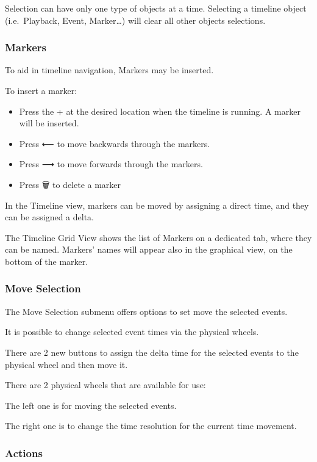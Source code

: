 \documentclass[
]{article}
\begin{document}
{Selection can have only one type of objects at a time. Selecting a timeline object (i.e.~Playback, Event, Marker\ldots) will clear all other objects selections.}

\hypertarget{markers}{%
\subsubsection{Markers}\label{markers}}

To aid in timeline navigation, Markers may be inserted.

To insert a marker:

\begin{itemize}
\item
  Press the + at the desired location when the timeline is running. A marker will be inserted.
\item
  Press ⟵ to move backwards through the markers.
\item
  Press ⟶ to move forwards through the markers.
\item
  Press 🗑️ to delete a marker
\end{itemize}

In the Timeline view, markers can be moved by assigning a direct time, and they can be assigned a delta.

The Timeline Grid View shows the list of Markers on a dedicated tab, where they can be named.
Markers' names will appear also in the graphical view, on the bottom of the marker.

\hypertarget{move-selection}{%
\subsubsection{Move Selection}\label{move-selection}}

The Move Selection submenu offers options to set move the selected events.

It is possible to change selected event times via the physical wheels.

There are 2 new buttons to assign the delta time for the selected events to the physical wheel and then move it.

There are 2 physical wheels that are available for use:

The left one is for moving the selected events.

The right one is to change the time resolution for the current time movement.

\hypertarget{actions}{%
\subsubsection{Actions}\label{actions}}
\end{document}
